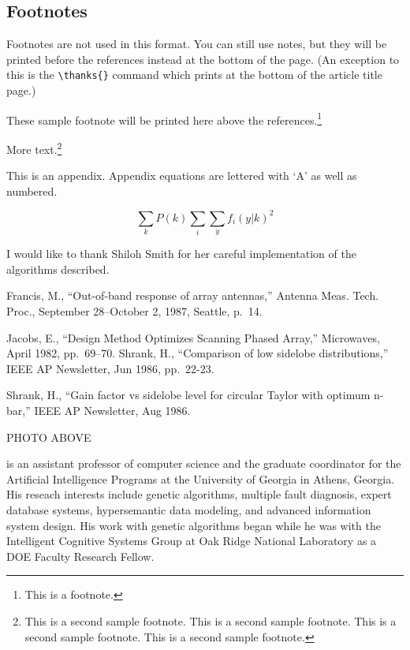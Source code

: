 \begin{article}
\section{Footnotes}
Footnotes are not used in this format. You can
still use notes, but they
will be printed before the references instead at the bottom
of the page. (An exception to this is the \verb+\thanks{}+ command
which prints at the bottom of the article title page.)

These sample footnote will be printed here above the
references.\footnote{This is a footnote.}

More text.\footnote{This is a second sample footnote.
This is a second sample footnote.
This is a second sample footnote.
This is a second sample footnote.}


\appendix
This is an appendix. Appendix equations are lettered with `A' 
as well as numbered.

\begin{equation}
\sum_k P(k) \sum_i \sum_y f_i(y|k)^2
\end{equation}


\acknowledgements
I would like to thank Shiloh Smith for her careful
implementation of the algorithms described.

\endnotes

\begin{references}
 Francis, M., ``Out-of-band response of array antennas,''
Antenna Meas.  Tech. Proc., September 28--October 2, 1987, Seattle, p.~14.

Jacobs, E., ``Design Method Optimizes Scanning
Phased Array,'' Microwaves, April 1982, pp.\ 69--70.
 Shrank, H., ``Comparison of low sidelobe 
distributions,'' IEEE AP
Newsletter, Jun 1986, pp.~22-23.

 Shrank, H., ``Gain factor vs 
sidelobe level for circular Taylor
with optimum n-bar,'' IEEE AP Newsletter, Aug 1986.
\end{references}




\vspace*{1in}
PHOTO ABOVE

is an assistant professor of computer science
and the graduate coordinator for the Artificial Intelligence Programs
at the University of Georgia in Athens, Georgia. His reseach
interests include genetic algorithms, multiple fault diagnosis,
expert database systems, hypersemantic data modeling, and advanced
information system design.  His work with genetic algorithms began
while he was with the Intelligent Cognitive Systems Group at Oak
Ridge National Laboratory as a DOE Faculty Research Fellow. 


\end{article}
